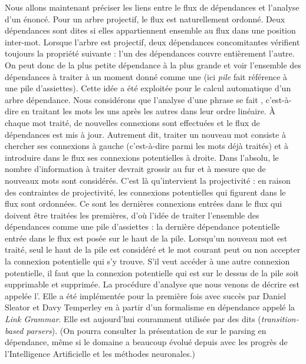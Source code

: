{    Nous allons maintenant préciser les liens entre le flux de dépendances et l’analyse d’un énoncé. Pour un arbre projectif, le flux est naturellement ordonné. Deux dépendances sont dites  si elles appartiennent ensemble au flux dans une position inter-mot. Lorsque l’arbre est projectif, deux dépendances concomitantes vérifient toujours la propriété suivante : l’un des dépendances couvre entièrement l’autre. On peut donc  de la plus petite dépendance à la plus grande et voir l’ensemble des dépendances à traiter à un moment donné comme une  (ici \textit{pile} fait référence à une pile d’assiettes). Cette idée a été exploitée pour le calcul automatique d’un arbre dépendance. Nous considérons que l’analyse d’une phrase se fait , c’est-à-dire en traitant les mots les uns après les autres dans leur ordre linéaire. À chaque mot traité, de nouvelles connexions sont effectuées et le flux de dépendances est mis à jour. Autrement dit, traiter un nouveau mot consiste à chercher ses connexions à gauche (c’est-à-dire parmi les mots déjà traités) et à introduire dans le flux ses connexions potentielles à droite. Dans l’absolu, le nombre d’information à traiter devrait grossir au fur et à mesure que de nouveaux mots sont considérés. C’est là qu’intervient la projectivité : en raison des contraintes de projectivité, les connexions potentielles qui figurent dans le flux sont ordonnées. Ce sont les dernières connexions entrées dans le flux qui doivent être traitées les premières, d’où l’idée de traiter l’ensemble des dépendances comme une pile d’assiettes : la dernière dépendance potentielle entrée dans le flux est posée sur le haut de la pile. Lorsqu’un nouveau mot est traité, seul le haut de la pile est considéré et le mot courant peut ou non accepter la connexion potentielle qui s’y trouve. S’il veut accéder à une autre connexion potentielle, il faut que la connexion potentielle qui est sur le dessus de la pile soit supprimable et supprimée. La procédure d’analyse que nous venons de décrire est appelée l’. Elle a été implémentée pour la première fois avec succès par Daniel Sleator et Davy Temperley en \citeyear{sleator1993parsing} à partir d'un formalisme en dépendance appelé la \textit{Link Grammar}. Elle est aujourd'hui couramment utilisée par des  dits  (\textit{transition-based parsers}). (On pourra consulter la présentation de \citet{kubler2009dependency} sur le parsing en dépendance, même si le domaine a beaucoup évolué depuis avec les progrès de l'Intelligence Artificielle et les méthodes neuronales.)

}
